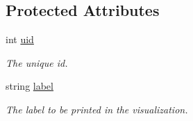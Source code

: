 \subsection*{Protected Attributes}
\begin{DoxyCompactItemize}
\item 
\hypertarget{classAST_a847b778f1c3dd5a19de32de432ee6e15}{int \hyperlink{classAST_a847b778f1c3dd5a19de32de432ee6e15}{uid}}\label{classAST_a847b778f1c3dd5a19de32de432ee6e15}

\begin{DoxyCompactList}\small\item\em The unique id. \end{DoxyCompactList}\item 
\hypertarget{classAST_ab2e239ccc0688d2341724432ff5a1a31}{string \hyperlink{classAST_ab2e239ccc0688d2341724432ff5a1a31}{label}}\label{classAST_ab2e239ccc0688d2341724432ff5a1a31}

\begin{DoxyCompactList}\small\item\em The label to be printed in the visualization. \end{DoxyCompactList}\end{DoxyCompactItemize}
